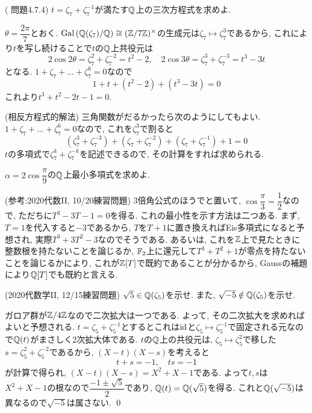 \begin{egprob} (\cite{aoyukie} 問題4.7.4)
$t=\zeta_7 + \zeta_7^{-1}$が満たす$\mathbb{Q}$上の三次方程式を求めよ.
\end{egprob}
\begin{egans} $\theta = \dfrac{2\pi}{7}$とおく.
$\operatorname{Gal}{(\mathbb{Q}(\zeta_7)/\mathbb{Q})}\cong (\mathbb{Z}/7\mathbb{Z})^{\times}$の生成元は$\zeta_7 \mapsto \zeta_7^{3}$であるから, これにより$t$を写し続けることで$t$の$\mathbb{Q}$上共役元は
\[2\cos{2\theta} = \zeta_7^{2} + \zeta_7^{-2} = t^2-2,\quad 2\cos{3\theta} = \zeta_{7}^{3} + \zeta_7^{-3} = t^3 - 3t\]
となる. $1+\zeta_7 + \dots + \zeta_7^{6} = 0$なので
\[1 + t + (t^2 - 2) + (t^3-3t) = 0\]
これより$t^3 + t^2 -2t -1 = 0$.
\end{egans}
\begin{egans} (相反方程式的解法) 三角関数がだるかったら次のようにしてもよい.  $1+\zeta_7 + \dots + \zeta_7^6 = 0$なので, これを$\zeta_7^3$で割ると
\[(\zeta_7^3 + \zeta_7^{-3}) + (\zeta_7 + \zeta_7^{-2}) + (\zeta_7 + \zeta_7^{-1}) + 1 = 0\]
$t$の多項式で$\zeta_7^{k} + \zeta_7^{-k}$を記述できるので, その計算をすれば求められる.
\end{egans}

\begin{egprob}
$\alpha=2\cos{\dfrac{\pi}{9}}$の$\mathbb{Q}$上最小多項式を求めよ.
\end{egprob}
\begin{egans} (参考:2020代数II, 10/20練習問題)
3倍角公式のほうでと置いて, $\cos{\dfrac{\pi}{3}} = \dfrac{1}{2}$なので, ただちに$T^3- 3T-1 = 0$を得る. これの最小性を示す方法は二つある. まず, $T=1$を代入すると$-3$であるから,  $T$を$T+1$に置き換えればEis多項式になると予想され, 実際$T^3 + 3T^2 - 3$なのでそうである. あるいは, これを$\mathbb{Z}$上で見たときに整数根を持たないことを論じるか, $\mathbb{F}_{2}$上に還元して$T^3 + T^2 + 1$が零点を持たないことを論じるかにより, これが$\mathbb{Z}[T]$で既約であることが分かるから, Gaussの補題により$\mathbb{Q}[T]$でも既約と言える.
\end{egans}


\begin{egprob} (2020代数学II, 12/15練習問題)
$\sqrt{5}\in \mathbb{Q}(\zeta_5)$を示せ. また, $\sqrt{-5}\notin \mathbb{Q}(\zeta_5)$を示せ.
\end{egprob}
\begin{egans} ガロア群が$\mathbb{Z}/4\mathbb{Z}$なので二次拡大は一つである. よって, その二次拡大を求めればよいと予想される.
$t=\zeta_5 + \zeta_5^{-1}$とするとこれは$\mathrm{id}$と$\zeta_5\mapsto \zeta_{5}^{-1}$で固定される元なので$\mathbb{Q}(t)$がまさしく2次拡大体である. $t$の$\mathbb{Q}$上の共役元は, $\zeta_5\mapsto \zeta_5^2$で移した$s=\zeta_5^2 + \zeta_5^{-2}$であるから, $(X-t)(X-s)$を考えると
\[t+s = -1, \quad ts = -1\]
が計算で得られ, $(X-t)(X-s) = X^2 + X - 1$である. よって$t,s$は$X^2 + X - 1$の根なので$\dfrac{-1\pm \sqrt{5}}{2}$であり, $\mathbb{Q}(t) = \mathbb{Q}(\sqrt{5})$を得る. これと$\mathbb{Q}(\sqrt{-5})$は異なるので$\sqrt{-5}$は属さない. \qed
\end{egans}


